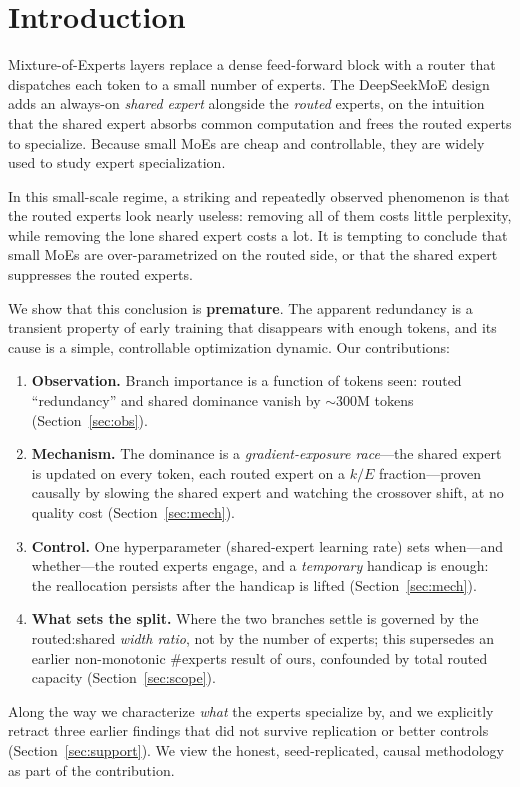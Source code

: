 \documentclass[11pt]{article}
\begin{document}
\section{Introduction}

Mixture-of-Experts layers replace a dense feed-forward block with a router that dispatches each
token to a small number of experts. The DeepSeekMoE design~\citep{dai2024deepseekmoe} adds an
always-on \emph{shared expert} alongside the \emph{routed} experts, on the intuition that the
shared expert absorbs common computation and frees the routed experts to specialize. Because small
MoEs are cheap and controllable, they are widely used to study expert specialization.

In this small-scale regime, a striking and repeatedly observed phenomenon is that the routed
experts look nearly useless: removing all of them costs little perplexity, while removing the lone
shared expert costs a lot. It is tempting to conclude that small MoEs are over-parametrized on the
routed side, or that the shared expert suppresses the routed experts.

We show that this conclusion is \textbf{premature}. The apparent redundancy is a transient property
of early training that disappears with enough tokens, and its cause is a simple, controllable
optimization dynamic. Our contributions:
\begin{enumerate}
  \item \textbf{Observation.} Branch importance is a function of tokens seen: routed ``redundancy''
  and shared dominance vanish by $\sim$300M tokens (Section~\ref{sec:obs}).
  \item \textbf{Mechanism.} The dominance is a \emph{gradient-exposure race}---the shared expert is
  updated on every token, each routed expert on a $k/E$ fraction---proven causally by slowing the
  shared expert and watching the crossover shift, at no quality cost (Section~\ref{sec:mech}).
  \item \textbf{Control.} One hyperparameter (shared-expert learning rate) sets when---and
  whether---the routed experts engage, and a \emph{temporary} handicap is enough: the reallocation
  persists after the handicap is lifted (Section~\ref{sec:mech}).
  \item \textbf{What sets the split.} Where the two branches settle is governed by the
  routed:shared \emph{width ratio}, not by the number of experts; this supersedes an earlier
  non-monotonic \#experts result of ours, confounded by total routed capacity
  (Section~\ref{sec:scope}).
\end{enumerate}
Along the way we characterize \emph{what} the experts specialize by, and we explicitly retract
three earlier findings that did not survive replication or better controls
(Section~\ref{sec:support}). We view the honest,
seed-replicated, causal methodology as part of the contribution.
\end{document}
